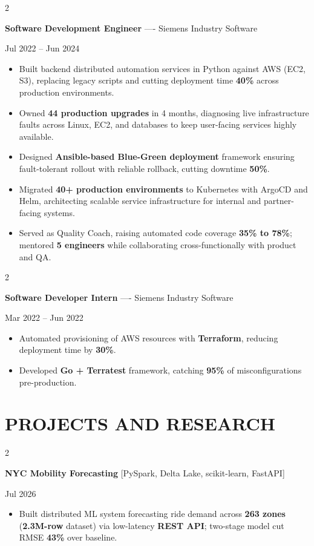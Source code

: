\documentclass[10pt, letterpaper]{article}
\newenvironment{highlights}{
    \begin{itemize}[
        topsep=0.10 cm,
        parsep=0.06 cm,
        partopsep=0pt,
        itemsep=0.06 cm,
        leftmargin=12pt
    ]
}{
    \end{itemize}
}
\newenvironment{twocolentry}[2][]{
    \onecolentry
    \def\secondColumn{#2}
    \setcolumnwidth{\fill, 4.5 cm}
    \begin{paracol}{2}
}{
    \switchcolumn \raggedleft \secondColumn
    \end{paracol}
    \endonecolentry
}
\begin{document}
\vspace{0.15 cm}

\begin{twocolentry}{Jul 2022 -- Jun 2024}
\textbf{Software Development Engineer} ---- Siemens Industry Software
\end{twocolentry}
\begin{highlights}
  \item Built backend distributed automation services in Python against AWS (EC2, S3), replacing legacy scripts and cutting deployment time \textbf{40\%} across production environments.
  \item Owned \textbf{44 production upgrades} in 4 months, diagnosing live infrastructure faults across Linux, EC2, and databases to keep user-facing services highly available.
  \item Designed \textbf{Ansible-based Blue-Green deployment} framework ensuring fault-tolerant rollout with reliable rollback, cutting downtime \textbf{50\%}.
  \item Migrated \textbf{40+ production environments} to Kubernetes with ArgoCD and Helm, architecting scalable service infrastructure for internal and partner-facing systems.
  \item Served as Quality Coach, raising automated code coverage \textbf{35\% to 78\%}; mentored \textbf{5 engineers} while collaborating cross-functionally with product and QA.
\end{highlights}

\vspace{0.15 cm}

\begin{twocolentry}{Mar 2022 -- Jun 2022}
\textbf{Software Developer Intern} ---- Siemens Industry Software
\end{twocolentry}
\begin{highlights}
  \item Automated provisioning of AWS resources with \textbf{Terraform}, reducing deployment time by \textbf{30\%}.
  \item Developed \textbf{Go + Terratest} framework, catching \textbf{95\%} of misconfigurations pre-production.
\end{highlights}

\section{PROJECTS AND RESEARCH}
\begin{twocolentry}{Jul 2026}
\textbf{NYC Mobility Forecasting} [PySpark, Delta Lake, scikit-learn, FastAPI]
\end{twocolentry}
\begin{highlights}
  \item Built distributed ML system forecasting ride demand across \textbf{263 zones} (\textbf{2.3M-row} dataset) via low-latency \textbf{REST API}; two-stage model cut RMSE \textbf{43\%} over baseline.
\end{highlights}
\end{document}
